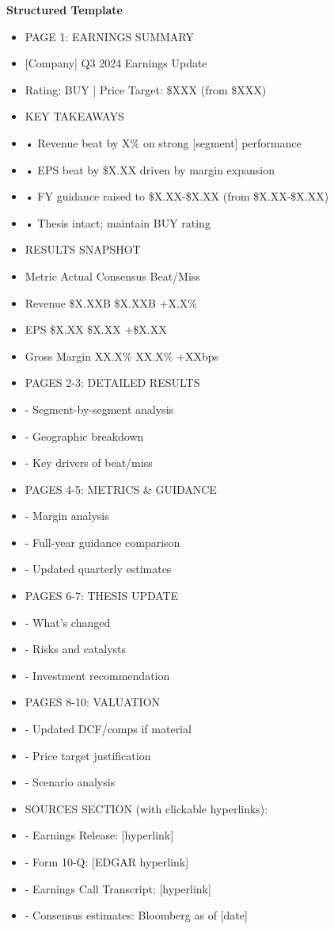 \documentclass[11pt]{article}
\begin{document}
\textbf{Structured Template}
\begin{itemize}[leftmargin=*,itemsep=2pt,topsep=2pt]
\item {} PAGE 1: EARNINGS SUMMARY
\item {} [Company] Q3 2024 Earnings Update
\item {} Rating: BUY | Price Target: \$XXX (from \$XXX)
\item {} KEY TAKEAWAYS
\item {} • Revenue beat by X\% on strong [segment] performance
\item {} • EPS beat by \$X.XX driven by margin expansion
\item {} • FY guidance raised to \$X.XX-\$X.XX (from \$X.XX-\$X.XX)
\item {} • Thesis intact; maintain BUY rating
\item {} RESULTS SNAPSHOT
\item {} Metric Actual Consensus Beat/Miss
\item {} Revenue \$X.XXB \$X.XXB +X.X\%
\item {} EPS \$X.XX \$X.XX +\$X.XX
\item {} Gross Margin XX.X\% XX.X\% +XXbps
\item {} PAGES 2-3: DETAILED RESULTS
\item {} - Segment-by-segment analysis
\item {} - Geographic breakdown
\item {} - Key drivers of beat/miss
\item {} PAGES 4-5: METRICS \& GUIDANCE
\item {} - Margin analysis
\item {} - Full-year guidance comparison
\item {} - Updated quarterly estimates
\item {} PAGES 6-7: THESIS UPDATE
\item {} - What's changed
\item {} - Risks and catalysts
\item {} - Investment recommendation
\item {} PAGES 8-10: VALUATION
\item {} - Updated DCF/comps if material
\item {} - Price target justification
\item {} - Scenario analysis
\item {} SOURCES SECTION (with clickable hyperlinks):
\item {} - Earnings Release: [hyperlink]
\item {} - Form 10-Q: [EDGAR hyperlink]
\item {} - Earnings Call Transcript: [hyperlink]
\item {} - Consensus estimates: Bloomberg as of [date]
\end{itemize}
\end{document}
